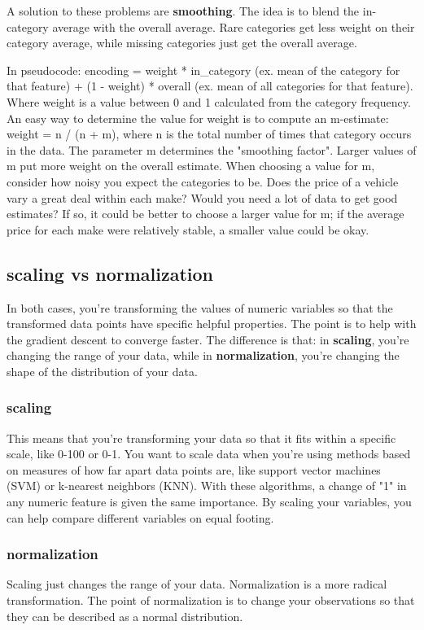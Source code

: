 \documentclass[12pt]{report}
\begin{document}
A solution to these problems are \textbf{smoothing}. The idea is to blend the in-category average with the overall average. Rare categories get less weight on their category average, while missing categories just get the overall average.

In pseudocode: encoding = weight * in\_category (ex. mean of the category for that feature) + (1 - weight) * overall (ex. mean of all categories for that feature). Where weight is a value between 0 and 1 calculated from the category frequency. An easy way to determine the value for weight is to compute an m-estimate: weight = n / (n + m), where n is the total number of times that category occurs in the data. The parameter m determines the "smoothing factor". Larger values of m put more weight on the overall estimate. When choosing a value for m, consider how noisy you expect the categories to be. Does the price of a vehicle vary a great deal within each make? Would you need a lot of data to get good estimates? If so, it could be better to choose a larger value for m; if the average price for each make were relatively stable, a smaller value could be okay.

\subsection{scaling vs normalization}

In both cases, you're transforming the values of numeric variables so that the transformed data points have specific helpful properties. The point is to help with the gradient descent to converge faster. The difference is that: in \textbf{scaling}, you're changing the range of your data, while in \textbf{normalization}, you're changing the shape of the distribution of your data.

\subsubsection{scaling}
This means that you're transforming your data so that it fits within a specific scale, like 0-100 or 0-1. You want to scale data when you're using methods based on measures of how far apart data points are, like support vector machines (SVM) or k-nearest neighbors (KNN). With these algorithms, a change of "1" in any numeric feature is given the same importance. By scaling your variables, you can help compare different variables on equal footing.

\subsubsection{normalization}
Scaling just changes the range of your data. Normalization is a more radical transformation. The point of normalization is to change your observations so that they can be described as a normal distribution.
\end{document}
